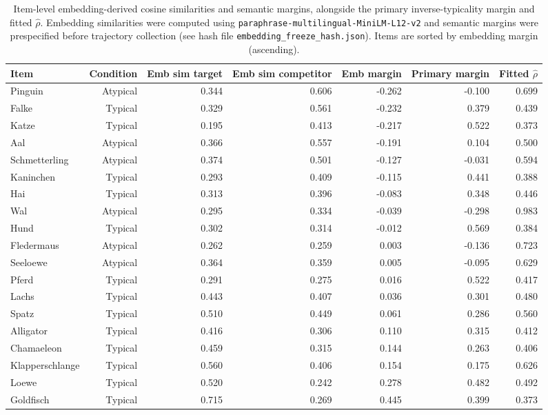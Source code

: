 \begin{table}[htbp]
\centering
\caption{Item-level embedding-derived cosine similarities and semantic margins, alongside the primary inverse-typicality margin and fitted $\hat{\rho}$. Embedding similarities were computed using \texttt{paraphrase-multilingual-MiniLM-L12-v2} and semantic margins were prespecified before trajectory collection (see hash file \texttt{embedding\_freeze\_hash.json}). Items are sorted by embedding margin (ascending).}
\label{tab:embedding-item-scores}
\small
\begin{tabular}{lrrrrrr}
\toprule
Item & Condition & Emb sim target & Emb sim competitor & Emb margin & Primary margin & Fitted $\hat{\rho}$ \\
\midrule
Pinguin & Atypical & 0.344 & 0.606 & -0.262 & -0.100 & 0.699 \\
Falke & Typical & 0.329 & 0.561 & -0.232 & 0.379 & 0.439 \\
Katze & Typical & 0.195 & 0.413 & -0.217 & 0.522 & 0.373 \\
Aal & Atypical & 0.366 & 0.557 & -0.191 & 0.104 & 0.500 \\
Schmetterling & Atypical & 0.374 & 0.501 & -0.127 & -0.031 & 0.594 \\
Kaninchen & Typical & 0.293 & 0.409 & -0.115 & 0.441 & 0.388 \\
Hai & Typical & 0.313 & 0.396 & -0.083 & 0.348 & 0.446 \\
Wal & Atypical & 0.295 & 0.334 & -0.039 & -0.298 & 0.983 \\
Hund & Typical & 0.302 & 0.314 & -0.012 & 0.569 & 0.384 \\
Fledermaus & Atypical & 0.262 & 0.259 & 0.003 & -0.136 & 0.723 \\
Seeloewe & Atypical & 0.364 & 0.359 & 0.005 & -0.095 & 0.629 \\
Pferd & Typical & 0.291 & 0.275 & 0.016 & 0.522 & 0.417 \\
Lachs & Typical & 0.443 & 0.407 & 0.036 & 0.301 & 0.480 \\
Spatz & Typical & 0.510 & 0.449 & 0.061 & 0.286 & 0.560 \\
Alligator & Typical & 0.416 & 0.306 & 0.110 & 0.315 & 0.412 \\
Chamaeleon & Typical & 0.459 & 0.315 & 0.144 & 0.263 & 0.406 \\
Klapperschlange & Typical & 0.560 & 0.406 & 0.154 & 0.175 & 0.626 \\
Loewe & Typical & 0.520 & 0.242 & 0.278 & 0.482 & 0.492 \\
Goldfisch & Typical & 0.715 & 0.269 & 0.445 & 0.399 & 0.373 \\
\bottomrule
\end{tabular}
\end{table}